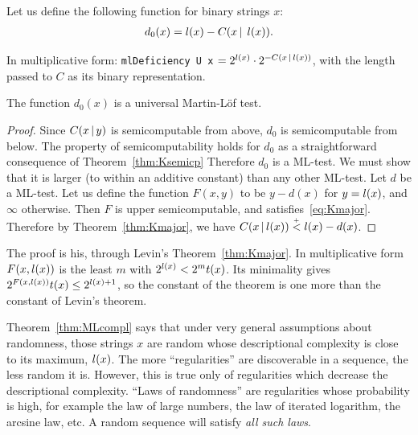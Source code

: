  \begin{definition}
  \label{def:g2.1.3}
  \leanok
Let us define the following function for binary strings $x$:
 \begin{align}\label{eq:d0}
 d_{0}(x) = l(x) - C(x \,\vert\,\; l(x)).
 \end{align}
 \end{definition}

\begin{formalization}
In multiplicative form: \texttt{mlDeficiency U x} \( = 2^{l(x)} \cdot 2^{-C(x \,\vert\, l(x))} \),
with the length passed to \( C \) as its binary representation.
\end{formalization}

\begin{theorem}[Martin-L\"of] \label{thm:MLcompl}
  \leanok
 The function $d_{0}(x)$ is a universal Martin-L\"of test.
 \end{theorem}
\begin{proof}
  \leanok
 Since $C(x \,\vert\, y)$ is semicomputable from above, $d_{0}$ is
semicomputable from below.
The property of semicomputability holds
for $d_{0}$ as a straightforward consequence of Theorem~\ref{thm:Ksemicp}
Therefore $d_{0}$ is a ML-test.
We must show that it is larger (to
within an additive constant) than any other ML-test. Let $d$ be a
ML-test.
Let us define the function $F(x,y)$ to be $y - d(x)$ for
$y = l(x)$, and $\infty$ otherwise.
Then $F$ is upper semicomputable, and
satisfies~\eqref{eq:Kmajor}.
Therefore by Theorem~\ref{thm:Kmajor}, we
have $C(x \,\vert\, l(x)) \stackrel{{}_+}{<} l(x) - d(x)$.
 \end{proof}

\begin{formalization}
The proof is his, through Levin's Theorem~\ref{thm:Kmajor}. In multiplicative form
\( F(x, l(x)) \) is the least \( m \) with \( 2^{l(x)} < 2^{m} t(x) \). Its minimality
gives \( 2^{F(x,l(x))} t(x) \le 2^{l(x)+1} \), so the constant of the theorem is one more
than the constant of Levin's theorem.
\end{formalization}

Theorem~\ref{thm:MLcompl} says that under very general assumptions
about randomness, those strings $x$ are random whose descriptional
complexity is close to its maximum, $l(x)$.
The more ``regularities'' are
discoverable in a sequence, the less random it is.
However, this is
true only of regularities which decrease the descriptional
complexity.
``Laws of randomness'' are regularities whose probability
is high, for example the law of large numbers, the law of iterated
logarithm, the arcsine law, etc.
A random sequence will satisfy \emph{all such laws}.

